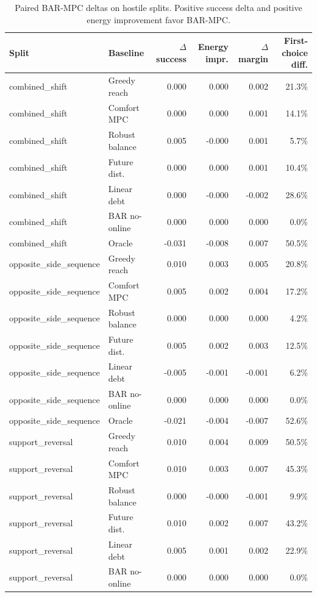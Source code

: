 \begin{table}[t]
\centering
\caption{Paired BAR-MPC deltas on hostile splits. Positive success delta and positive energy improvement favor BAR-MPC.}
\label{tab:hostile-pairwise}
\scriptsize
\begin{tabular}{llrrrr}
\toprule
Split & Baseline & $\Delta$ success & Energy impr. & $\Delta$ margin & First-choice diff. \\
\midrule
combined\_shift & Greedy reach & 0.000 & 0.000 & 0.002 & 21.3\% \\
combined\_shift & Comfort MPC & 0.000 & 0.000 & 0.001 & 14.1\% \\
combined\_shift & Robust balance & 0.005 & -0.000 & 0.001 & 5.7\% \\
combined\_shift & Future dist. & 0.000 & 0.000 & 0.001 & 10.4\% \\
combined\_shift & Linear debt & 0.000 & -0.000 & -0.002 & 28.6\% \\
combined\_shift & BAR no-online & 0.000 & 0.000 & 0.000 & 0.0\% \\
combined\_shift & Oracle & -0.031 & -0.008 & 0.007 & 50.5\% \\
opposite\_side\_sequence & Greedy reach & 0.010 & 0.003 & 0.005 & 20.8\% \\
opposite\_side\_sequence & Comfort MPC & 0.005 & 0.002 & 0.004 & 17.2\% \\
opposite\_side\_sequence & Robust balance & 0.000 & 0.000 & 0.000 & 4.2\% \\
opposite\_side\_sequence & Future dist. & 0.005 & 0.002 & 0.003 & 12.5\% \\
opposite\_side\_sequence & Linear debt & -0.005 & -0.001 & -0.001 & 6.2\% \\
opposite\_side\_sequence & BAR no-online & 0.000 & 0.000 & 0.000 & 0.0\% \\
opposite\_side\_sequence & Oracle & -0.021 & -0.004 & -0.007 & 52.6\% \\
support\_reversal & Greedy reach & 0.010 & 0.004 & 0.009 & 50.5\% \\
support\_reversal & Comfort MPC & 0.010 & 0.003 & 0.007 & 45.3\% \\
support\_reversal & Robust balance & 0.000 & -0.000 & -0.001 & 9.9\% \\
support\_reversal & Future dist. & 0.010 & 0.002 & 0.007 & 43.2\% \\
support\_reversal & Linear debt & 0.005 & 0.001 & 0.002 & 22.9\% \\
support\_reversal & BAR no-online & 0.000 & 0.000 & 0.000 & 0.0\% \\

\end{tabular}
\end{table}
